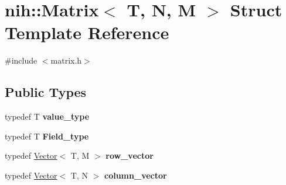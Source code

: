 \hypertarget{structnih_1_1_matrix}{
\section{nih\-:\-:\-Matrix$<$ \-T, \-N, \-M $>$ \-Struct \-Template \-Reference}
\label{structnih_1_1_matrix}
}


{\ttfamily \#include $<$matrix.\-h$>$}

\subsection*{\-Public \-Types}
\begin{DoxyCompactItemize}
\item 
\hypertarget{group__linalg_ga57a6a191f034235a2090e25f7e4216bc}{
typedef \-T {\bfseries value\-\_\-type}}
\label{group__linalg_ga57a6a191f034235a2090e25f7e4216bc}

\item 
\hypertarget{group__linalg_ga084e3e4c41631a62d3eeeb2b434fa821}{
typedef \-T {\bfseries \-Field\-\_\-type}}
\label{group__linalg_ga084e3e4c41631a62d3eeeb2b434fa821}

\item 
\hypertarget{group__linalg_ga5fda3b8edf6f01802cb90be364fb25a6}{
typedef \hyperlink{structnih_1_1_vector}{\-Vector}$<$ \-T, \-M $>$ {\bfseries row\-\_\-vector}}
\label{group__linalg_ga5fda3b8edf6f01802cb90be364fb25a6}

\item 
\hypertarget{group__linalg_ga163c5c162d300e8dccac52a74a8df252}{
typedef \hyperlink{structnih_1_1_vector}{\-Vector}$<$ \-T, \-N $>$ {\bfseries column\-\_\-vector}}
\label{group__linalg_ga163c5c162d300e8dccac52a74a8df252}

\end{DoxyCompactItemize}
